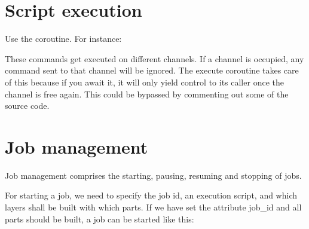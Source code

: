 \documentclass[letterpaper,10pt,english,openany,oneside]{sphinxmanual}
\begin{document}
\section{Script execution}
\label{\detokenize{aconityapi:script-execution}}
Use the  coroutine. For instance:

\begin{sphinxVerbatim}[commandchars=\\\{\}]
  
  
  
  
\end{sphinxVerbatim}

These commands get executed on different channels. If a channel is occupied,
any command sent to that channel will be ignored. The execute coroutine takes
care of this because if you await it, it will only yield control to its caller
once the channel is free again. This could be bypassed by commenting out some
of the source code.


\section{Job management}
\label{\detokenize{aconityapi:job-management}}
Job management comprises the starting, pausing, resuming and stopping of jobs.

For starting a job, we need to specify the job id, an execution script, and which
layers shall be built with which parts. If we have set the attribute job\_id and
all parts should be built, a job can be started like this:

\begin{sphinxVerbatim}[commandchars=\\\{\}]
  \PYG{p}{[}\PYG{p}{]} 

  \PYGZbs{}

  
\end{sphinxVerbatim}
\end{document}

